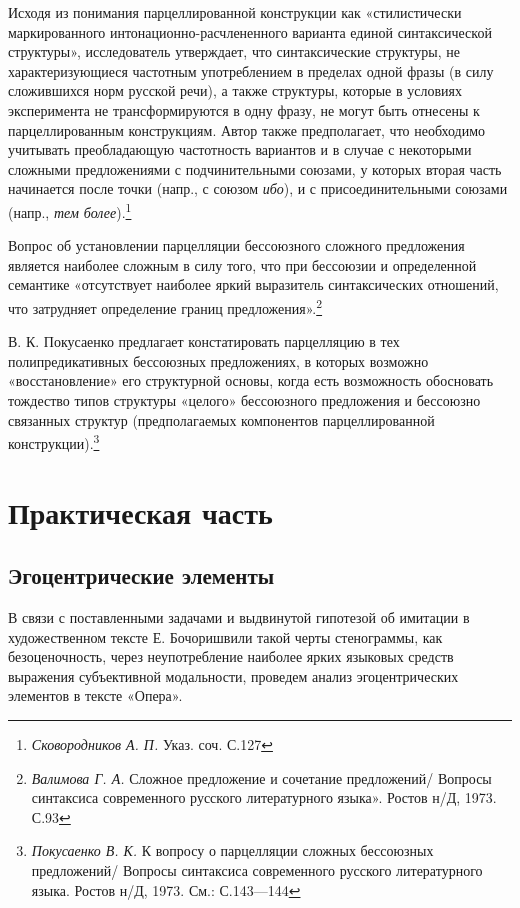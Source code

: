 \documentclass{kursa4}
\begin{document}
{{      {Исходя из понимания парцеллированной конструкции
      как «стилистически маркированного интонационно-расчлененного варианта
      единой синтаксической структуры», исследователь утверждает, что
      синтаксические структуры, не характеризующиеся частотным употреблением
      в пределах одной фразы (в силу сложившихся норм русской речи), а также
      структуры, которые в условиях эксперимента не трансформируются в одну
      фразу, не могут быть отнесены к парцеллированным конструкциям. Автор
      также предполагает, что необходимо учитывать преобладающую частотность
      вариантов и в случае с некоторыми сложными предложениями с
      подчинительными союзами, у которых вторая часть начинается после точки
      (напр., с союзом }\textit{{ибо}}{), и
      с присоединительными союзами (напр., }\textit{{тем
      более}}{).}\footnote{\textit{{
      Сковородников А. П. }}{Указ. соч. С.127}}

      {Вопрос об установлении парцелляции бессоюзного
      сложного предложения является наиболее сложным в силу того, что при
      бессоюзии и определенной семантике «отсутствует наиболее яркий
      выразитель синтаксических отношений, что затрудняет определение границ
      предложения».}\footnote{{
      }\textit{{Валимова Г. А. }}{Сложное
      предложение и сочетание предложений/ Вопросы синтаксиса современного
      русского литературного языка». Ростов н/Д, 1973. С.93}}

      {В. К. Покусаенко предлагает констатировать
      парцелляцию в тех полипредикативных бессоюзных предложениях, в которых
      возможно «восстановление» его структурной основы, когда есть
      возможность обосновать тождество типов структуры «целого» бессоюзного
      предложения и бессоюзно связанных структур (предполагаемых компонентов
      парцеллированной конструкции).}\footnote{{
      }\textit{{Покусаенко В. К. }}{К
      вопросу о парцелляции сложных бессоюзных предложений/ Вопросы
      синтаксиса современного русского литературного языка. Ростов н/Д,
      1973. См.: С.143—144}}

  \chapter{Практическая часть}

    \section{Эгоцентрические элементы}

      В связи с поставленными задачами и выдвинутой
      гипотезой об имитации в художественном тексте Е. Бочоришвили такой
      черты стенограммы, как безоценочность, через неупотребление наиболее
      ярких языковых средств выражения субъективной модальности, проведем
      анализ эгоцентрических элементов в тексте «Опера».

}}
\end{document}

